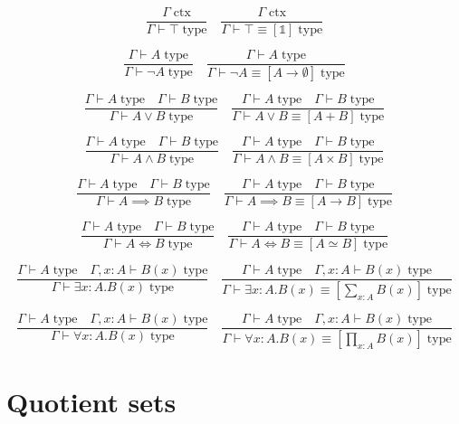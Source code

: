 \documentclass{book}
\begin{document}
$$\frac{\Gamma \; \mathrm{ctx}}{\Gamma \vdash \top \; \mathrm{type}} \quad \frac{\Gamma \; \mathrm{ctx}}{\Gamma \vdash \top \equiv [\mathbb{1}] \; \mathrm{type}}$$

$$\frac{\Gamma \vdash A \; \mathrm{type}}{\Gamma \vdash \neg A \; \mathrm{type}} \quad \frac{\Gamma \vdash A \; \mathrm{type}}{\Gamma \vdash \neg A \equiv [A \to \emptyset] \; \mathrm{type}}$$

$$\frac{\Gamma \vdash A \; \mathrm{type} \quad \Gamma \vdash B \; \mathrm{type}}{\Gamma \vdash A \vee B \; \mathrm{type}} \quad \frac{\Gamma \vdash A \; \mathrm{type} \quad \Gamma \vdash B \; \mathrm{type}}{\Gamma \vdash A \vee B \equiv [A + B] \; \mathrm{type}}$$

$$\frac{\Gamma \vdash A \; \mathrm{type} \quad \Gamma \vdash B \; \mathrm{type}}{\Gamma \vdash A \wedge B \; \mathrm{type}} \quad \frac{\Gamma \vdash A \; \mathrm{type} \quad \Gamma \vdash B \; \mathrm{type}}{\Gamma \vdash A \wedge B \equiv [A \times B] \; \mathrm{type}}$$

$$\frac{\Gamma \vdash A \; \mathrm{type} \quad \Gamma \vdash B \; \mathrm{type}}{\Gamma \vdash A \implies B \; \mathrm{type}} \quad \frac{\Gamma \vdash A \; \mathrm{type} \quad \Gamma \vdash B \; \mathrm{type}}{\Gamma \vdash A \implies B \equiv [A \to B] \; \mathrm{type}}$$

$$\frac{\Gamma \vdash A \; \mathrm{type} \quad \Gamma \vdash B \; \mathrm{type}}{\Gamma \vdash A \iff B \; \mathrm{type}} \quad \frac{\Gamma \vdash A \; \mathrm{type} \quad \Gamma \vdash B \; \mathrm{type}}{\Gamma \vdash A \iff B \equiv [A \simeq B] \; \mathrm{type}}$$

$$\frac{\Gamma \vdash A \; \mathrm{type} \quad \Gamma, x:A \vdash B(x) \; \mathrm{type}}{\Gamma \vdash \exists x:A.B(x) \; \mathrm{type}} \quad \frac{\Gamma \vdash A \; \mathrm{type} \quad \Gamma, x:A \vdash B(x) \; \mathrm{type}}{\Gamma \vdash \exists x:A.B(x) \equiv \left[\sum_{x:A} B(x)\right] \; \mathrm{type}}$$

$$\frac{\Gamma \vdash A \; \mathrm{type} \quad \Gamma, x:A \vdash B(x) \; \mathrm{type}}{\Gamma \vdash \forall x:A.B(x) \; \mathrm{type}} \quad \frac{\Gamma \vdash A \; \mathrm{type} \quad \Gamma, x:A \vdash B(x) \; \mathrm{type}}{\Gamma \vdash \forall x:A.B(x) \equiv \left[\prod_{x:A} B(x)\right] \; \mathrm{type}}$$

\section{Quotient sets}
\end{document}
